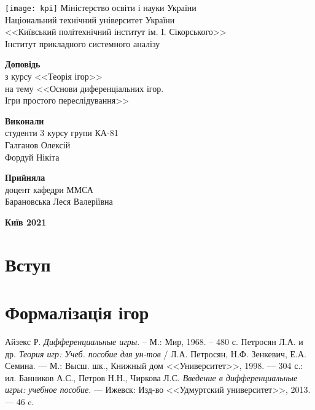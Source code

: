 \documentclass{extreport}
\begin{document}
\begin{titlepage}
    \thispagestyle{empty}
    \begin{center}
        \texttt{[image: kpi]}
        Міністерство освіти і науки України\\
        Національний технічний університет України\\
        <<Київський політехнічний інститут ім. І. Сікорського>>\\
        Інститут прикладного системного аналізу
    \end{center}
    \vspace{30mm}
    \begin{center}
        \fontsize{22}{26}\selectfont\textbf{Доповідь} \\
        з курсу <<Теорія ігор>> \\
        на тему <<Основи диференціальних ігор. \\ Ігри простого переслідування>>
    \end{center}
    \vspace{30mm}
    \begin{flushleft}
        \textbf{Виконали} \\ 
        студенти 3 курсу групи КА-81 \\
        Галганов Олексій \\
        Фордуй Нікіта
    \end{flushleft}
    \begin{flushright}
        \textbf{Прийняла} \\
        доцент кафедри ММСА \\
        Барановська Леся Валеріївна
    \end{flushright}
    \vspace{30mm}
    \begin{center}
        \textbf{Київ 2021}
    \end{center}
\end{titlepage}
\tableofcontents
    \chapter{Вступ}
        
    \chapter{Формалізація ігор}
        

    
    \begin{thebibliography}{3}
         Айзекс Р. \emph{Дифференциальные игры}. -- М.: Мир, 1968. -- 480 с.
         Петросян Л.А. и др. \emph{Теория игр: Учеб. пособие для ун-тов }/ Л.А. Петросян, Н.Ф. Зенкевич, Е.А. Семина. --- М.: Высш. шк.,
        Книжный дом <<Университет>>, 1998. --- 304 с.: ил.
         Банников А.С., Петров Н.Н., Чиркова Л.С. \emph{Введение в дифференциальные игры: учебное пособие}. --- Ижевск: Изд-во 
        <<Удмуртский университет>>, 2013. --- 46 c.
    \end{thebibliography}
\end{document}
